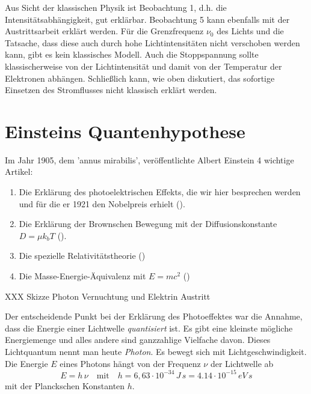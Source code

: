 Aus Sicht der klassischen Physik ist Beobachtung 1, d.h. die Intensitätsabhängigkeit, gut erklärbar. Beobachtung 5 kann ebenfalls mit der Austrittsarbeit erklärt werden. Für die Grenzfrequenz $\nu_0$ des Lichts und die Tatsache, dass diese auch durch hohe Lichtintensitäten nicht verschoben werden kann, gibt es kein klassisches Modell. Auch die Stoppspannung sollte klassischerweise von der Lichtintensität und damit von der Temperatur der Elektronen abhängen. Schließlich kann, wie oben diskutiert, das sofortige Einsetzen des Stromflusses nicht klassisch erklärt werden.


\section{Einsteins Quantenhypothese}

Im Jahr 1905, dem 'annus mirabilis',  veröffentlichte Albert Einstein 4 wichtige Artikel:
\begin{enumerate}\setlength{\itemsep}{0pt}
    \item Die Erklärung des photoelektrischen Effekts, die wir hier besprechen werden und für die er 1921 den Nobelpreis erhielt (\cite{Einstein05_licht}).
    \item Die Erklärung der Brownschen Bewegung mit der Diffusionskonstante $D = \mu k_b T$ (\cite{Einstein05_waerme}).
    \item Die spezielle Relativitätstheorie (\cite{Einstein05_ED})
    \item Die Masse-Energie-Äquivalenz mit $E = m c^2$ (\cite{Einstein05_energie})
\end{enumerate}

\begin{marginfigure}
    \caption{XXX Skizze Photon Vernuchtung und Elektrin Austritt }
   \end{marginfigure}


Der entscheidende Punkt bei der Erklärung des Photoeffektes war die Annahme, dass die Energie einer Lichtwelle \emph{quantisiert} ist. Es gibt eine kleinste mögliche Energiemenge und alles andere sind ganzzahlige Vielfache davon. Dieses Lichtquantum nennt man heute \emph{Photon}. Es bewegt sich mit Lichtgeschwindigkeit.  Die Energie $E$ eines Photons hängt von der Frequenz $\nu$ der Lichtwelle ab
\begin{equation}
    E = h \, \nu \quad \text{mit} \quad h = 6,63 \cdot 10^{-34} \, J \, s = 4.14 \cdot 10^{-15}\, eV \, s
\end{equation}
mit der Planckschen Konstanten $h$. 

